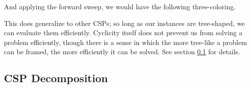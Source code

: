 \begin{center}
\end{center}

And applying the forward sweep, we would have the following three-coloring.

\begin{center}
\end{center}

This does generalize to other CSPs; so long as our instances are tree-shaped, we can evaluate them efficiently. Cyclicity itself does not prevent us from solving a problem efficiently, though there is a sense in which the more tree-like a problem can be framed, the more efficiently it can be solved. See section \ref{sec:csp-decomposition} for details.

\subsection{CSP Decomposition}\label{sec:csp-decomposition}

